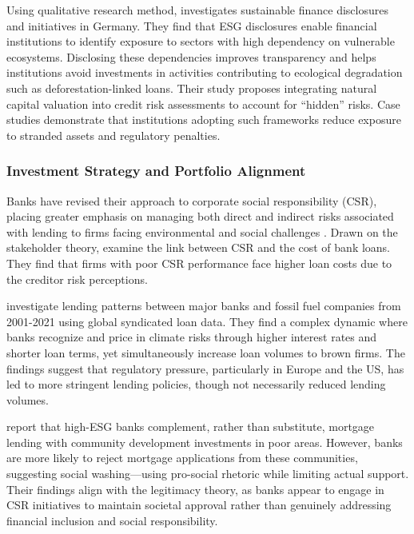 \documentclass[
  authoryear]{elsarticle}
\begin{document}
Using qualitative research method, \citet{KUHN2022} investigates
sustainable finance disclosures and initiatives in Germany. They find
that ESG disclosures enable financial institutions to identify exposure
to sectors with high dependency on vulnerable ecosystems. Disclosing
these dependencies improves transparency and helps institutions avoid
investments in activities contributing to ecological degradation such as
deforestation-linked loans. Their study proposes integrating natural
capital valuation into credit risk assessments to account for ``hidden''
risks. Case studies demonstrate that institutions adopting such
frameworks reduce exposure to stranded assets and regulatory penalties.

\subsubsection{Investment Strategy and Portfolio
Alignment}\label{investment-strategy-and-portfolio-alignment}

Banks have revised their approach to corporate social responsibility
(CSR), placing greater emphasis on managing both direct and indirect
risks associated with lending to firms facing environmental and social
challenges \citep{CARNEVALE2012}. Drawn on the stakeholder theory,
\citet{GOSS2011} examine the link between CSR and the cost of bank
loans. They find that firms with poor CSR performance face higher loan
costs due to the creditor risk perceptions.

\citet{DEMETRIADES2025} investigate lending patterns between major banks
and fossil fuel companies from 2001-2021 using global syndicated loan
data. They find a complex dynamic where banks recognize and price in
climate risks through higher interest rates and shorter loan terms, yet
simultaneously increase loan volumes to brown firms. The findings
suggest that regulatory pressure, particularly in Europe and the US, has
led to more stringent lending policies, though not necessarily reduced
lending volumes.

\citet{BASU2022} report that high-ESG banks complement, rather than
substitute, mortgage lending with community development investments in
poor areas. However, banks are more likely to reject mortgage
applications from these communities, suggesting social washing---using
pro-social rhetoric while limiting actual support. Their findings align
with the legitimacy theory, as banks appear to engage in CSR initiatives
to maintain societal approval rather than genuinely addressing financial
inclusion and social responsibility.
\end{document}

